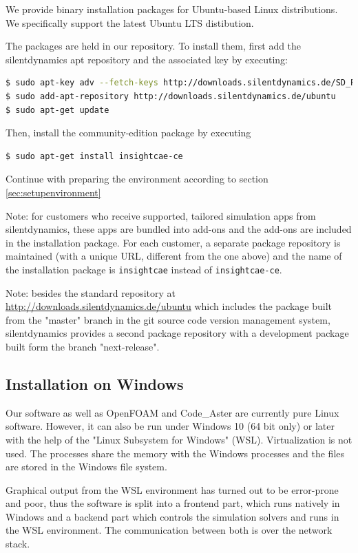 We provide binary installation packages for Ubuntu-based Linux distributions. We specifically support the latest Ubuntu LTS distibution.

The packages are held in our repository. To install them, first add the silentdynamics apt repository and the associated key by executing:

\begin{lstlisting}[language=bash]
$ sudo apt-key adv --fetch-keys http://downloads.silentdynamics.de/SD_REPOSITORIES_PUBLIC_KEY.gpg
$ sudo add-apt-repository http://downloads.silentdynamics.de/ubuntu
$ sudo apt-get update
\end{lstlisting}

Then, install the community-edition package by executing

\begin{lstlisting}[language=bash]
$ sudo apt-get install insightcae-ce
\end{lstlisting}

Continue with preparing the environment according to section \ref{sec:setupenvironment}

Note: for customers who receive supported, tailored simulation apps from silentdynamics, these apps are bundled into add-ons and the add-ons are included in the installation package.
For each customer, a separate package repository is maintained (with a unique URL, different from the one above) and the name of the installation package is \texttt{insightcae} instead of \texttt{insightcae-ce}.

Note: besides the standard repository at \url{http://downloads.silentdynamics.de/ubuntu} which includes the package built from the "master" branch in the git source code version management system, silentdynamics provides a second package repository with a development package built form the branch "next-release".

\subsection{Installation on Windows}
Our software as well as OpenFOAM and Code\_Aster are currently pure Linux software. 
However, it can also be run under Windows 10 (64 bit only) or later with the help of the "Linux Subsystem for Windows" (WSL).
Virtualization is not used. 
The processes share the memory with the Windows processes and the files are stored in the Windows file system. 

Graphical output from the WSL environment has turned out to be error-prone and poor, thus the software is split into a frontend part, which runs natively in Windows and a backend part which controls the simulation solvers and runs in the WSL environment.
The communication between both is over the network stack.

